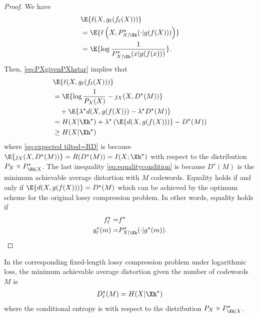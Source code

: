 \documentclass[draftclsnofoot, onecolumn, letterpaper, romanappendices]{IEEEtran}
\begin{document}
\begin{proof}
    We have
    \begin{align*}
        &\E{\ell(X,g_{\ell}(f_{\ell}(X)))}\nonumber\\
        & =\E{\ell\left(X,P_{X|\Xh}^{\star}(\cdot|g(f(X)))\right)}\\
        &= \E{\log\frac{1}{P_{X|\Xh}^{\star}(x|g(f(x)))}}.
    \end{align*}
    Then, \eqref{eq:PXgivenPXhstar} implies that
    \begin{align}
        &\E{\ell(X,g_{\ell}(f_{\ell}(X)))}\nonumber\\
        &=\E{\log\frac{1}{P_X(X)} - \jmath_X(X,D^\star(M))}\nonumber\\
        &~~~ + \E{\lambda^\star d(X,g(f(X))) - \lambda^\star D^\star(M)}\nonumber\\
        &= H(X|\Xh^{\star}) + \lambda^{\star}\left(\E{d(X,g(f(X)))}-D^{\star}(M)\right)
            \label{eq:expected tilted=RD}\\
        & \geq H(X|\Xh^{\star}) \label{eq:equalitycondition}
    \end{align}
    where \eqref{eq:expected tilted=RD} is because
    $\E{\jmath_X(X,D^\star(M))} = R(D^\star(M)) = I(X;\Xh^\star)$
    with respect to the distribution $P_X \times P_{\Xh|X}^\star$.
    The last inequality \eqref{eq:equalitycondition} is because $D^\star(M)$ is the minimum achievable
    average distortion with $M$ codewords.
    Equality holds if and only if $\E{d(X,g(f(X)))}=D^{\star}(M)$ which can be achieved by
    the optimum scheme for the original lossy compression problem.
    In other words, equality holds if
    \begin{align*}
        f^\star_\ell =& f^\star\\
        g^\star_\ell(m) =& P_{X|\Xh}^\star(\cdot|g^\star(m)).
    \end{align*}
\end{proof}

\begin{remark}
    In the corresponding fixed-length lossy compression problem under logarithmic loss,
    the minimum achievable average distortion given the number of codewords $M$ is
    \begin{align*}
        D^\star_{\ell}(M) = H(X|\Xh^\star)
    \end{align*}
    where the conditional entropy is with respect to the distribution $P_X\times P_{\Xh|X}^\star$.
\end{remark}
\end{document}
